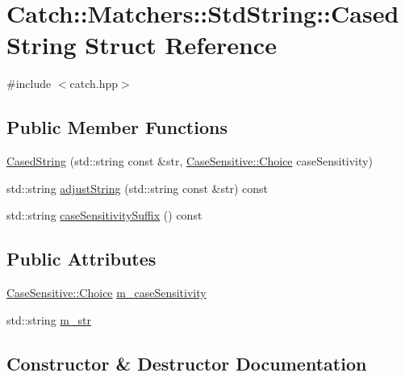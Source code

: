 \hypertarget{struct_catch_1_1_matchers_1_1_std_string_1_1_cased_string}{}\section{Catch\+::Matchers\+::Std\+String\+::Cased\+String Struct Reference}
\label{struct_catch_1_1_matchers_1_1_std_string_1_1_cased_string}


{\ttfamily \#include $<$catch.\+hpp$>$}

\subsection*{Public Member Functions}
\begin{DoxyCompactItemize}
\item 
\mbox{\hyperlink{struct_catch_1_1_matchers_1_1_std_string_1_1_cased_string_aa88bbc5acd2bff22351d8d4b1816b561}{Cased\+String}} (std\+::string const \&str, \mbox{\hyperlink{struct_catch_1_1_case_sensitive_aad49d3aee2d97066642fffa919685c6a}{Case\+Sensitive\+::\+Choice}} case\+Sensitivity)
\item 
std\+::string \mbox{\hyperlink{struct_catch_1_1_matchers_1_1_std_string_1_1_cased_string_a77639b1165c01f424ee0e96f53335010}{adjust\+String}} (std\+::string const \&str) const
\item 
std\+::string \mbox{\hyperlink{struct_catch_1_1_matchers_1_1_std_string_1_1_cased_string_a9759155344d696b2476d764a1d95fcc9}{case\+Sensitivity\+Suffix}} () const
\end{DoxyCompactItemize}
\subsection*{Public Attributes}
\begin{DoxyCompactItemize}
\item 
\mbox{\hyperlink{struct_catch_1_1_case_sensitive_aad49d3aee2d97066642fffa919685c6a}{Case\+Sensitive\+::\+Choice}} \mbox{\hyperlink{struct_catch_1_1_matchers_1_1_std_string_1_1_cased_string_ae1c2864c986941536a6e94cca0528f92}{m\+\_\+case\+Sensitivity}}
\item 
std\+::string \mbox{\hyperlink{struct_catch_1_1_matchers_1_1_std_string_1_1_cased_string_ad05dbc99aba3c3c386d6b856b213f911}{m\+\_\+str}}
\end{DoxyCompactItemize}


\subsection{Constructor \& Destructor Documentation}
\mbox{\label{struct_catch_1_1_matchers_1_1_std_string_1_1_cased_string_aa88bbc5acd2bff22351d8d4b1816b561}} 
